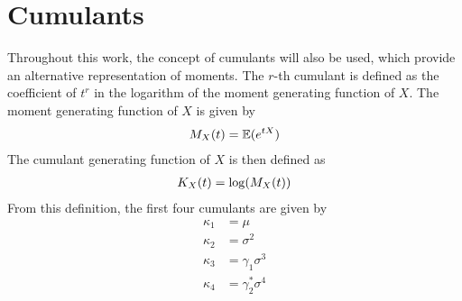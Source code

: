 \section{Cumulants}

Throughout this work, the concept of cumulants will also be used, which provide an alternative representation of moments. The $r$-th cumulant is defined as the coefficient of $t^r$ in the logarithm of the moment generating function of $X$. The moment generating function of $X$ is given by
\begin{align}
    M_X(t) = \mathbb{E}(e^{tX})\notag
\end{align}
The cumulant generating function of $X$ is then defined as
\begin{align}
    K_X(t) = \log(M_X(t))\notag
\end{align} 
From this definition, the first four cumulants are given by
\begin{align}
    \label{eq:cumulants_1}
    \kappa_1 &= \mu\\
    \label{eq:cumulants_2}
    \kappa_2 &= \sigma^2\\
    \label{eq:cumulants_3}
    \kappa_3 &= \gamma_1\sigma^3\\
    \label{eq:cumulants_4}
    \kappa_4 &= \gamma_2^*\sigma^4
\end{align}

